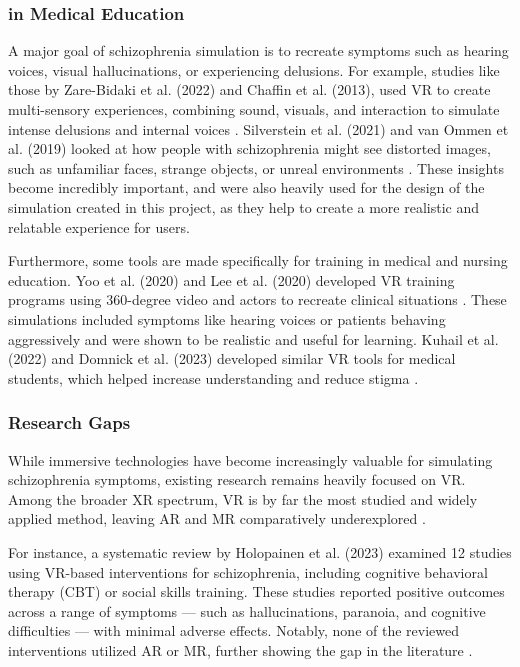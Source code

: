 \subsubsection{in Medical Education}

A major goal of schizophrenia simulation is to recreate symptoms such as hearing voices, visual hallucinations, or experiencing delusions. For example, studies like those by Zare-Bidaki et al. (2022) and Chaffin et al. (2013), used VR to create multi-sensory experiences, combining sound, visuals, and interaction to simulate intense delusions and internal voices \cite{Zare-Bidaki2022,Chaffin2013}. Silverstein et al. (2021) and van Ommen et al. (2019) looked at how people with schizophrenia might see distorted images, such as unfamiliar faces, strange objects, or unreal environments \cite{Silverstein2021,Vanommen2019}. These insights become incredibly important, and were also heavily used for the design of the simulation created in this project, as they help to create a more realistic and relatable experience for users.

Furthermore, some tools are made specifically for training in medical and nursing education. Yoo et al. (2020) and Lee et al. (2020) developed VR training programs using 360-degree video and actors to recreate clinical situations \cite{Yoo2020, Lee2020}. These simulations included symptoms like hearing voices or patients behaving aggressively and were shown to be realistic and useful for learning. Kuhail et al. (2022) and Domnick et al. (2023) developed similar VR tools for medical students, which helped increase understanding and reduce stigma \cite{Kuhail2022, Domnick2023}.

\subsubsection{Research Gaps}

While immersive technologies have become increasingly valuable for simulating schizophrenia symptoms, existing research remains heavily focused on VR. Among the broader XR spectrum, VR is by far the most studied and widely applied method, leaving AR and MR comparatively underexplored \cite{Kuhail2022}.

For instance, a systematic review by Holopainen et al. (2023) examined 12 studies using VR-based interventions for schizophrenia, including cognitive behavioral therapy (CBT) or social skills training. These studies reported positive outcomes across a range of symptoms — such as hallucinations, paranoia, and cognitive difficulties — with minimal adverse effects. Notably, none of the reviewed interventions utilized AR or MR, further showing the gap in the literature \cite{Holopainen2023}.

